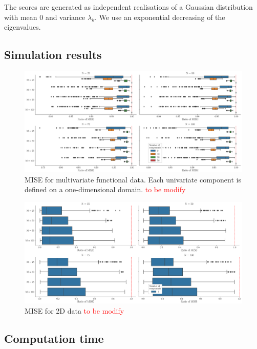The scores are generated as independent realisations of a Gaussian distribution with mean $0$ and variance $\lambda_k$. We use an exponential decreasing of the eigenvalues.

\subsection{Simulation results} %
\label{sub:simulation_results}

\begin{figure}
    \centering
    \includegraphics[scale=0.25]{figures/mise_pall.eps}
    \caption{MISE for multivariate functional data. Each univariate component is defined on a one-dimensional domain. \textcolor{red}{to be modify}}
    \label{fig:mise_mfd_1d}
\end{figure}

\begin{figure}
    \centering
    \includegraphics[scale=0.25]{figures/mise_p1.eps}
    \caption{MISE for 2D data \textcolor{red}{to be modify}}
    \label{fig:mise_fd_2d}
\end{figure}



\subsection{Computation time} %
\label{sub:computation_time}

